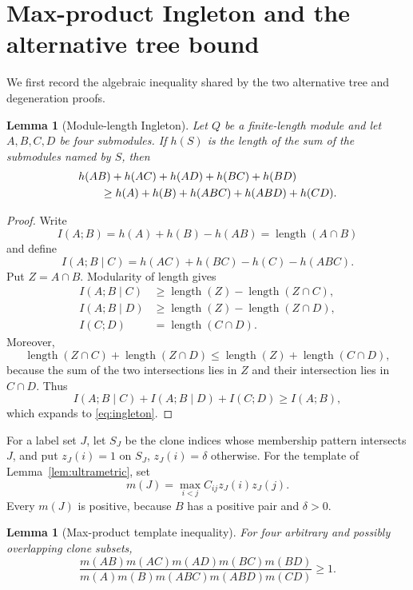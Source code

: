 \documentclass[11pt]{article}
\newtheorem{lemma}[theorem]{Lemma}
\theoremstyle{remark}
\newcommand{\length}{\operatorname{length}}
\begin{document}
\section{Max-product Ingleton and the alternative tree bound}
\label{sec:explicit-bound}

We first record the algebraic inequality shared by the two alternative
tree and degeneration proofs.

\begin{lemma}[Module-length Ingleton]
\label{lem:module-ingleton}
Let $Q$ be a finite-length module and let $A,B,C,D$ be four submodules.  If
$h(S)$ is the length of the sum of the submodules named by $S$, then
\begin{align}
 &h(AB)+h(AC)+h(AD)+h(BC)+h(BD)\notag\\
 &\qquad\geq h(A)+h(B)+h(ABC)+h(ABD)+h(CD).
 \label{eq:ingleton}
\end{align}
\end{lemma}

\begin{proof}
Write
\[
 I(A;B)=h(A)+h(B)-h(AB)=\length(A\cap B)
\]
and define
\[
 I(A;B\mid C)=h(AC)+h(BC)-h(C)-h(ABC).
\]
Put $Z=A\cap B$.  Modularity of length gives
\begin{align*}
 I(A;B\mid C)&\geq\length(Z)-\length(Z\cap C),\\
 I(A;B\mid D)&\geq\length(Z)-\length(Z\cap D),\\
 I(C;D)&=\length(C\cap D).
\end{align*}
Moreover,
\[
 \length(Z\cap C)+\length(Z\cap D)
 \leq\length(Z)+\length(C\cap D),
\]
because the sum of the two intersections lies in $Z$ and their intersection
lies in $C\cap D$.  Thus
\[
 I(A;B\mid C)+I(A;B\mid D)+I(C;D)\geq I(A;B),
\]
which expands to \eqref{eq:ingleton}.
\end{proof}

For a label set $J$, let $S_J$ be the clone indices whose membership pattern
intersects $J$, and put $z_J(i)=1$ on $S_J$, $z_J(i)=\delta$ otherwise.
For the template of Lemma~\ref{lem:ultrametric}, set
\[
 m(J)=\max_{i<j}C_{ij}z_J(i)z_J(j).
\]
Every $m(J)$ is positive, because $B$ has a positive pair and $\delta>0$.

\begin{lemma}[Max-product template inequality]
\label{lem:max-product}
For four arbitrary and possibly overlapping clone subsets,
\begin{equation}
 \frac{m(AB)m(AC)m(AD)m(BC)m(BD)}
      {m(A)m(B)m(ABC)m(ABD)m(CD)}\geq1.
 \label{eq:max-product}
\end{equation}
\end{lemma}
\end{document}
